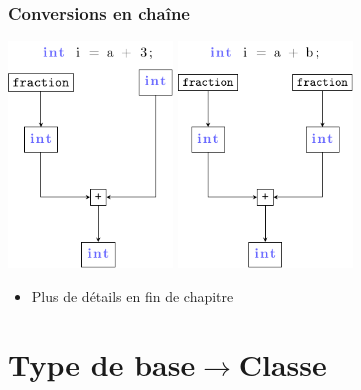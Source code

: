 \begin{frame}
\frametitle{Conversions en chaîne}
\begin{center}
\includegraphics[height=6cm]{pics/conv-1.pdf}
\hspace{2cm}
\includegraphics[height=6cm]{pics/conv-2.pdf}
\end{center}
\begin{itemize}
\item Plus de détails en fin de chapitre
\end{itemize}
\end{frame}

\section{Type de base$\rightarrow$Classe}

